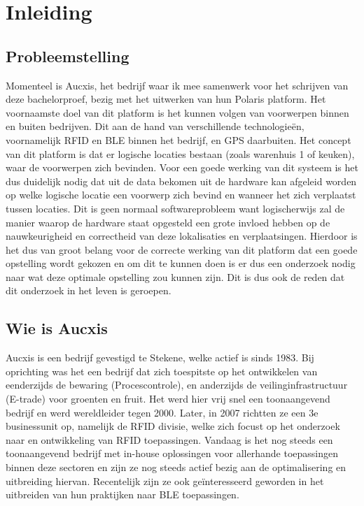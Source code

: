 
\chapter{Inleiding}
\label{ch:inleiding}

\section{Probleemstelling}
\label{sec:probleemstelling}

Momenteel is Aucxis, het bedrijf waar ik mee samenwerk voor het schrijven van deze bachelorproef, bezig met het uitwerken van hun Polaris platform. Het voornaamste doel van dit platform is het kunnen volgen van voorwerpen binnen en buiten bedrijven. Dit aan de hand van verschillende technologieën, voornamelijk RFID en BLE binnen het bedrijf, en GPS daarbuiten. 
Het concept van dit platform is dat er logische locaties bestaan (zoals warenhuis 1 of keuken), waar de voorwerpen zich bevinden. Voor een goede werking van dit systeem is het dus duidelijk nodig dat uit de data bekomen uit de hardware kan afgeleid worden op welke logische locatie een voorwerp zich bevind en wanneer het zich verplaatst tussen locaties. Dit is geen normaal softwareprobleem want logischerwijs zal de manier waarop de hardware staat opgesteld een grote invloed hebben op de nauwkeurigheid en correctheid van deze lokalisaties en verplaatsingen. Hierdoor is het dus van groot belang voor de correcte werking van dit platform dat een goede opstelling wordt gekozen en om dit te kunnen doen is er dus een onderzoek nodig naar wat deze optimale opstelling zou kunnen zijn. Dit is dus ook de reden dat dit onderzoek in het leven is geroepen.

\section{Wie is Aucxis}
\label{sec:wie-is-aucxis}
Aucxis is een bedrijf gevestigd te Stekene, welke actief is sinds 1983. Bij oprichting was het een bedrijf dat zich toespitste op het ontwikkelen van eenderzijds de bewaring (Procescontrole), en anderzijds de veilinginfrastructuur (E-trade) voor groenten en fruit. Het werd hier vrij snel een toonaangevend bedrijf en werd wereldleider tegen 2000. Later, in 2007 richtten ze een 3e businessunit op, namelijk de RFID divisie, welke zich focust op het onderzoek naar en ontwikkeling van RFID toepassingen. Vandaag is het nog steeds een toonaangevend bedrijf met in-house oplossingen voor allerhande toepassingen binnen deze sectoren en zijn ze nog steeds actief bezig aan de optimalisering en uitbreiding hiervan. Recentelijk zijn ze ook geïnteresseerd geworden in het uitbreiden van hun praktijken naar BLE toepassingen.

